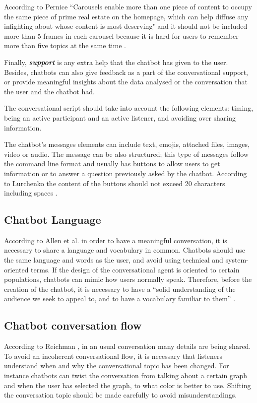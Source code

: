 \documentclass[a4paper,10pt]{article}
\begin{document}
According to Pernice ``Carousels enable more than one piece of content to occupy the same piece of prime real estate on the homepage, which can help diffuse any infighting about whose content is most deserving" and it should not be included more than 5 frames in each carousel because it is hard for users to remember more than five topics at the same time \cite{carousel}.  


Finally, \textbf{\textit{support}} is any extra help that the chatbot has given to the user. Besides, chatbots can also give feedback as a part of the conversational support, or provide meaningful insights about the data analysed or the conversation that the user and the chatbot had. 

The conversational script should take into account the following elements: timing, being an active participant and an active listener, and avoiding over sharing information.

The chatbot's messages elements can include text, emojis, attached files, images, video or audio. The message can be also structured; this type of messages follow the command line format and usually has buttons to allow users to get information or to answer a question previously asked by the chatbot. According to Lurchenko the content of the buttons should not exceed 20 characters including spaces \cite{CheatSheet}.

\subsection*{Chatbot Language}
According to Allen et al. \cite{allen1978conversation} in order to have a meaningful conversation, it is necessary to share a language and vocabulary in common. Chatbots should use the same language and words as the user, and avoid using technical and system-oriented terms. If the design of the conversational agent is oriented to certain populations, chatbots can mimic how users normally speak.  Therefore, before the creation of the chatbot, it is necessary to have a ``solid understanding of the audience we seek to appeal to, and to have a vocabulary familiar to them”  \cite{HeuristicsWebPage}. 

\subsection*{Chatbot conversation flow}
According to Reichman \cite{reichman1985getting}, in an usual conversation many details are being shared. To avoid an incoherent conversational flow, it is necessary that listeners understand when and why the conversational topic has been changed. For instance chatbots can twist the conversation from talking about a certain graph and when the user has selected the graph, to what color is better to use. Shifting the conversation topic should be made carefully to avoid misunderstandings. 
\end{document}
